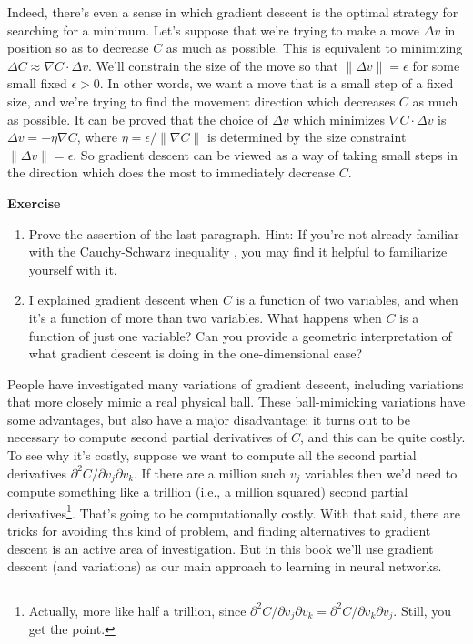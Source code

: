 Indeed, there's even a sense in which gradient descent is the optimal strategy for searching for a minimum. Let's suppose that we're trying to make a move $\Delta v$ in position so as to decrease $C$ as much as possible. This is equivalent to minimizing $\Delta C \approx \nabla C \cdot \Delta v$. We'll constrain the size of the move so that $\parallel\Delta v\parallel=\epsilon$ for some small fixed $\epsilon>0$. In other words, we want a move that is a small step of a fixed size, and we're trying to find the movement direction which decreases $C$ as much as possible. It can be proved that the choice of $\Delta v$ which minimizes $\nabla C \cdot \Delta v$ is $\Delta v=-\eta \nabla C$, where $\eta=\epsilon /\parallel\nabla C\parallel$ is determined by the size constraint $\|\Delta v\|=\epsilon$. So gradient descent can be viewed as a way of taking small steps in the direction which does the most to immediately decrease $C$.

\textbf{Exercise}
\begin{enumerate}
\item
Prove the assertion of the last paragraph. Hint: If you're not already familiar with the Cauchy-Schwarz inequality \cite{WikiPediaCauchySchwarz2019}, you may find it helpful to familiarize yourself with it.
\item 
I explained gradient descent when $C$ is a function of two variables, and when it's a function of more than two variables. What happens when $C$ is a function of just one variable? Can you provide a geometric interpretation of what gradient descent is doing in the one-dimensional case? 
\end{enumerate}


People have investigated many variations of gradient descent, including variations that more closely mimic a real physical ball. These ball-mimicking variations have some advantages, but also have a major disadvantage: it turns out to be necessary to compute second partial derivatives of $C$, and this can be quite costly. To see why it's costly, suppose we want to compute all the second partial derivatives $\partial^{2} C / \partial v_{j} \partial v_{k}$. If there are a million such $v_j$ variables then we'd need to compute something like a trillion (i.e., a million squared) second partial derivatives\footnote{Actually, more like half a trillion, since $\partial^{2} C / \partial v_{j} \partial v_{k}=\partial^{2} C / \partial v_{k} \partial v_{j}$. Still, you get the point.}. 
 That's going to be computationally costly. With that said, there are tricks for avoiding this kind of problem, and finding alternatives to gradient descent is an active area of investigation. But in this book we'll use gradient descent (and variations) as our main approach to learning in neural networks.

